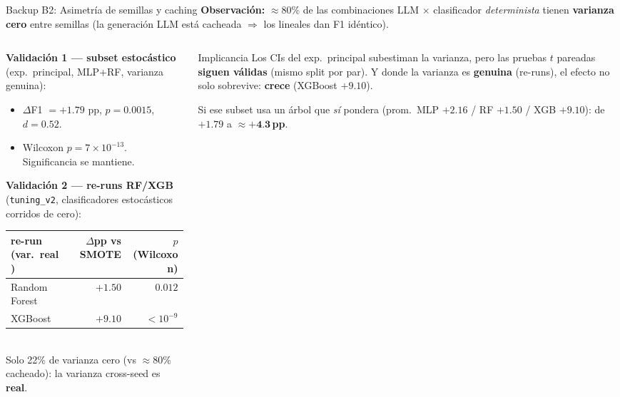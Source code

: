 \begin{frame}{Backup B2: Asimetría de semillas y caching}
\small
\textbf{Observación:} $\approx$80\% de las combinaciones LLM $\times$ clasificador \emph{determinista} tienen \textbf{varianza cero} entre semillas (la generación LLM está cacheada $\Rightarrow$ los lineales dan F1 idéntico).

\vspace{0.3em}
\begin{columns}[T]

\begin{column}{0.58\textwidth}
\scriptsize
\textbf{Validación 1 --- subset estocástico} (exp.\ principal, MLP+RF, varianza genuina):
\begin{itemize}\setlength\itemsep{0pt}
  \item $\Delta$F1 $= +1{.}79$ pp, $p = 0{.}0015$, $d = 0{.}52$.
  \item Wilcoxon $p = 7{\times}10^{-13}$. Significancia se mantiene.
\end{itemize}

\vspace{0.4em}
\textbf{Validación 2 --- re-runs RF/XGB} (\texttt{tuning\_v2}, clasificadores estocásticos corridos de cero):

\vspace{2pt}
\begin{tabular}{@{}lrr@{}}
\toprule
re-run (var.\ real) & $\Delta$pp vs SMOTE & $p$ (Wilcoxon) \\
\midrule
Random Forest & $+1{.}50$ & $0{.}012$ \\
XGBoost       & $+9{.}10$ & $<10^{-9}$ \\
\bottomrule
\end{tabular}\\[3pt]
{\tiny Solo 22\% de varianza cero (vs $\approx$80\% cacheado): la varianza cross-seed es \textbf{real}.}
\end{column}

\begin{column}{0.42\textwidth}
\begin{block}{Implicancia}
\scriptsize
Los CIs del exp.\ principal subestiman la varianza, pero las pruebas $t$ pareadas \textbf{siguen válidas} (mismo split por par). Y donde la varianza es \textbf{genuina} (re-runs), el efecto no solo sobrevive: \textbf{crece} (XGBoost $+9{.}10$).

\vspace{0.3em}
Si ese subset usa un árbol que \emph{sí} pondera (prom.\ MLP $+2{.}16$ / RF $+1{.}50$ / XGB $+9{.}10$): de $+1{.}79$ a $\boldsymbol{\approx +4{.}3}$\,\textbf{pp}.
\end{block}
\end{column}

\end{columns}
\end{frame}

